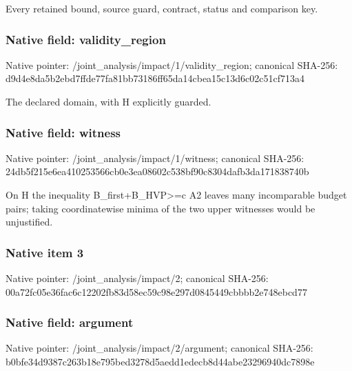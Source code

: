 \documentclass[10pt,a4paper]{article}
\begin{document}
\begingroup\raggedright\sloppy Every retained bound,\allowbreak{} source guard,\allowbreak{} contract,\allowbreak{} status and comparison key.\par\endgroup

\subsubsection{Native field: validity\_\allowbreak{}region}
Native pointer: /joint\_\allowbreak{}analysis/impact/1/validity\_\allowbreak{}region; canonical SHA-256: d9d4e8da5b2ebd7ffde77fa81bb73186ff65da14cbea15c13d6c02c51cf713a4

\begingroup\raggedright\sloppy The declared domain,\allowbreak{} with H explicitly guarded.\par\endgroup

\subsubsection{Native field: witness}
Native pointer: /joint\_\allowbreak{}analysis/impact/1/witness; canonical SHA-256: 24db5f215e6ea410253566cb0e3ea08602c538bf90c8304dafb3da171838740b

\begingroup\raggedright\sloppy On H the inequality B\_\allowbreak{}first+B\_\allowbreak{}HVP>=\allowbreak{}c A2 leaves many incomparable budget pairs;\allowbreak{} taking coordinatewise minima of the two upper witnesses would be unjustified.\par\endgroup

\subsubsection{Native item 3}
Native pointer: /joint\_\allowbreak{}analysis/impact/2; canonical SHA-256: 00a72fc05e36fac6c12202fb83d58ec59c98e297d0845449cbbbb2e748ebcd77

\subsubsection{Native field: argument}
Native pointer: /joint\_\allowbreak{}analysis/impact/2/argument; canonical SHA-256: b0bfe34d9387c263b18e795bed3278d5aedd1edecb8d44abe23296940dc7898e
\end{document}
